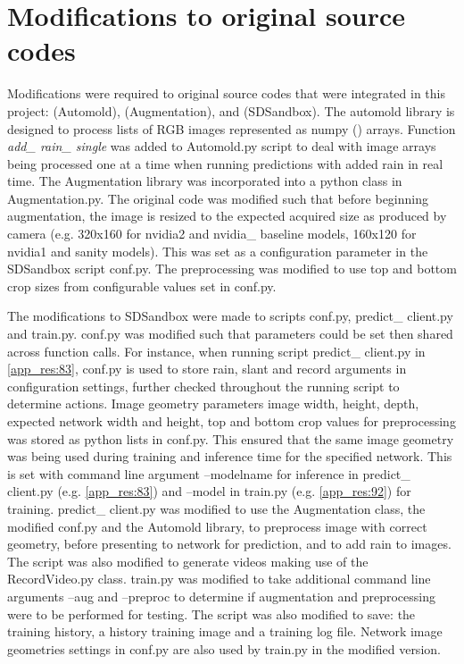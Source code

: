 
\section{Modifications to original source codes}
Modifications were required to original source codes that were integrated in this project: \cite{Saxena2017} (Automold), \cite{Naoki2016} (Augmentation), and \cite{SDSandboxSim} (SDSandbox). The automold library is designed to process lists of RGB images represented as numpy (\cite{harris2020array}) arrays. Function \textit{add\_ rain\_ single} was added to Automold.py script to deal with image arrays being processed one at a time when running predictions with added rain in real time. The Augmentation library was incorporated into a python class in Augmentation.py. The original code was modified such that before beginning augmentation, the image is resized to the expected acquired size as produced by camera (e.g. 320x160 for nvidia2 and nvidia\_ baseline models, 160x120 for nvidia1 and sanity models). This was set as a configuration parameter in the SDSandbox script conf.py. The preprocessing was modified to use top and bottom crop sizes from configurable values set in conf.py.  
 
The modifications to SDSandbox were made to scripts conf.py, predict\_ client.py and train.py. conf.py was modified such that parameters could be set then shared across function calls. For instance, when running script predict\_ client.py in \ref{app_res:83}, conf.py is used to store rain, slant and record arguments in configuration settings, further checked throughout the running script to determine actions. Image geometry parameters image width, height, depth, expected network width and height, top and bottom crop values for preprocessing was stored as python lists in conf.py. This ensured that the same image geometry was being used during training and inference time for the specified network. This is set with command line argument --modelname for inference in predict\_ client.py (e.g. \ref{app_res:83}) and --model in train.py (e.g. \ref{app_res:92}) for training.  
predict\_ client.py was modified to use the Augmentation class, the modified conf.py and the Automold library, to preprocess image with correct geometry, before presenting to network for prediction, and to add rain to images. The script was also modified to generate videos making use of the RecordVideo.py class.  
train.py was modified to take additional command line arguments --aug and --preproc to determine if augmentation and preprocessing were to be performed for testing. The script was also modified to save: the training history, a history training image and a training log file. Network image geometries settings in conf.py are also used by train.py in the modified version.
